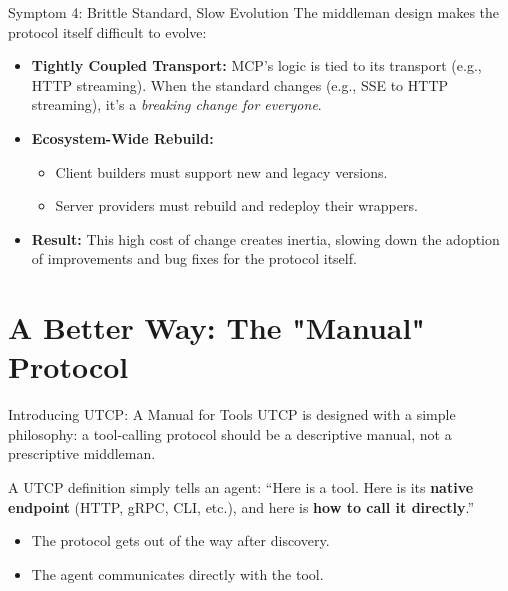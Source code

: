 \documentclass{beamer}
\begin{document}
\begin{frame}{Symptom 4: Brittle Standard, Slow Evolution}
  The middleman design makes the protocol itself difficult to evolve:
  \begin{itemize}
    \item \textbf{Tightly Coupled Transport:} MCP's logic is tied to its transport (e.g., HTTP streaming). When the standard changes (e.g., SSE to HTTP streaming), it's a \textit{breaking change for everyone}.
    \vfill
    \item \textbf{Ecosystem-Wide Rebuild:} 
    \begin{itemize}
        \item Client builders must support new and legacy versions.
        \item Server providers must rebuild and redeploy their wrappers.
    \end{itemize}
    \vfill
    \item \textbf{Result:} This high cost of change creates inertia, slowing down the adoption of improvements and bug fixes for the protocol itself.
  \end{itemize}
\end{frame}

\section{A Better Way: The "Manual" Protocol}

\begin{frame}{Introducing UTCP: A Manual for Tools}
  UTCP is designed with a simple philosophy: a tool-calling protocol should be a descriptive manual, not a prescriptive middleman.
  \begin{tcolorbox}[colback=green!5!white,colframe=green!75!black,title=The UTCP Philosophy]
    A UTCP definition simply tells an agent: ``Here is a tool. Here is its \textbf{native endpoint} (HTTP, gRPC, CLI, etc.), and here is \textbf{how to call it directly}.''
  \end{tcolorbox}
  \vfill
  \begin{itemize}
    \item The protocol gets out of the way after discovery.
    \item The agent communicates directly with the tool.
  \end{itemize}
\end{frame}
\end{document}
